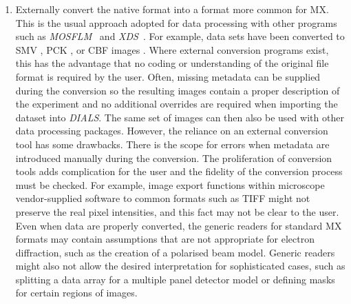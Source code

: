 \documentclass[preprint]{iucr}
\newcommand{\dials}{\emph{DIALS}\xspace}
\newcommand{\xds}{\emph{XDS}\xspace}
\newcommand{\mosflm}{\emph{MOSFLM}\xspace}
\begin{document}
\begin{enumerate}
  \item Externally convert the native format into a format more common for MX.
  This is the usual approach adopted for data processing with
  other programs such as \mosflm~\cite{leslie2007} and
  \xds~\cite{kabsch2010xds}. For example, data sets have been converted to SMV
  \cite{Hattne2015}, PCK \cite{Clabbers2017}, or CBF images \cite{Gruene2018}.
  Where external conversion programs exist, this has the advantage that no
  coding or understanding of the original file format is required by the user.
  Often, missing metadata can be supplied during the conversion so the
  resulting images contain a proper description of the experiment and no
  additional overrides are required when importing the dataset into \dials. The
  same set of images can then also be used with other data processing packages.
  However, the reliance on an external conversion tool has some drawbacks.
  There is the scope for errors when metadata are introduced manually during
  the conversion. The proliferation of conversion tools adds complication for
  the user and the fidelity of the conversion process must be checked. For
  example, image export functions within microscope vendor-supplied software to
  common formats such as TIFF might not preserve the real pixel intensities,
  and this fact may not be clear to the user. Even when data are properly
  converted, the generic readers for standard MX formats may contain
  assumptions that are not appropriate for electron diffraction, such as the
  creation of a polarised beam model. Generic readers might also not allow the
  desired interpretation for sophisticated cases, such as splitting a data
  array for a multiple panel detector model or defining masks for certain
  regions of images.


\end{enumerate}
\end{document}
